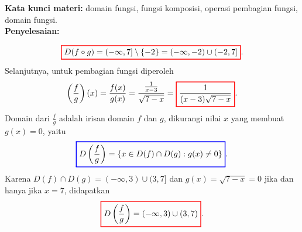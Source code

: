 \documentclass[10pt,openany,a4paper]{article}
\theoremstyle{definition}
\theoremstyle{definition}
\theoremstyle{plain}
\newenvironment{jawab}[2][tes]{%
\par\noindent\textbf{Kata kunci materi:} #1.\\
\textbf{Penyelesaian:} #2%
}{}
\begin{document}
\begin{enumerate}
\begin{jawab}[domain fungsi, fungsi komposisi, operasi pembagian fungsi, domain fungsi]
{\begin{enumerate}
            \begin{align*}
                \colorlet{oldcolor}{.}
        \color{red}
        \setlength{\fboxrule}{1pt} \boxed{\color{oldcolor}D(f\circ g) = (-\infty, 7] \setminus \{-2\} = (-\infty, -2) \cup (-2, 7]}\color{oldcolor}.
            \end{align*}
            Selanjutnya, untuk pembagian fungsi diperoleh
            \begin{align*}
                \left(\frac{f}{g}\right)(x) = \frac{f(x)}{g(x)} = \frac{\frac{1}{x-3}}{\sqrt{7-x}} = \colorlet{oldcolor}{.}
        \color{red}
        \setlength{\fboxrule}{1pt} \boxed{\color{oldcolor}\frac{1}{(x-3)\sqrt{7-x}}}\color{oldcolor}.
            \end{align*}
            Domain dari $\frac{f}{g}$ adalah irisan domain $f$ dan $g$, dikurangi nilai $x$ yang membuat $g(x)=0$, yaitu
            \begin{align*}
                \colorlet{oldcolor}{.}
        \color{blue}
        \setlength{\fboxrule}{1pt} \boxed{\color{oldcolor}D\left(\frac{f}{g}\right) = \{x \in D(f)\cap D(g) : g(x) \neq 0\}}\color{oldcolor}.
            \end{align*}
            Karena $D(f)\cap D(g) = (-\infty,3)\cup(3,7]$ dan $g(x)=\sqrt{7-x}=0$ jika dan hanya jika $x=7$, didapatkan
            \begin{align*}
                \colorlet{oldcolor}{.}
        \color{red}
        \setlength{\fboxrule}{1pt} \boxed{\color{oldcolor}D\left(\frac{f}{g}\right) = (-\infty, 3) \cup (3, 7)}\color{oldcolor}.
            \end{align*}
        \end{enumerate}
    }
    \end{jawab}


\end{enumerate}
\end{document}
